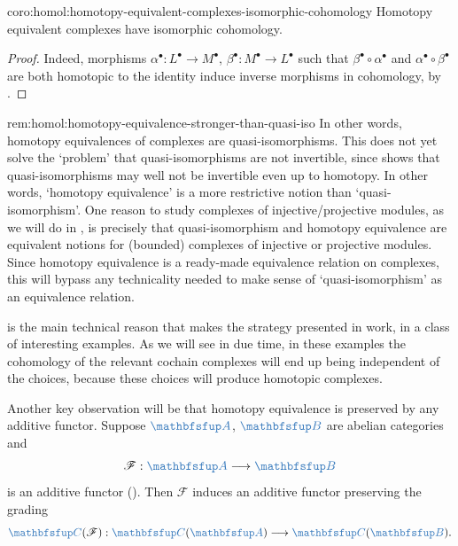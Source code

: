 \begin{coro}{}{coro:homol:homotopy-equivalent-complexes-isomorphic-cohomology}
  Homotopy equivalent complexes have isomorphic cohomology.
\end{coro}

\begin{proof}
  Indeed, morphisms $\alpha^\bullet : L^\bullet \to M^\bullet$,
  $\beta^\bullet : M^\bullet \to L^\bullet$ such that
  $\beta^\bullet \circ \alpha^\bullet$ and
  $\alpha^\bullet \circ \beta^\bullet$ are both homotopic to the
  identity induce inverse morphisms in cohomology, by
  .
\end{proof}

\begin{rem}{}{rem:homol:homotopy-equivalence-stronger-than-quasi-iso}
  In other words, homotopy equivalences of complexes are
  quasi-isomorphisms. This does not yet solve the `problem' that
  quasi-isomorphisms are not invertible, since  shows
  that quasi-isomorphisms may well not be invertible even up to
  homotopy.  In other words, `homotopy equivalence' is a more
  restrictive notion than `quasi-isomorphism'. One reason to study
  complexes of injective/projective modules, as we will do in
  ,
  is precisely that quasi-isomorphism and homotopy equivalence are
  equivalent notions for (bounded) complexes of injective or
  projective modules. Since homotopy equivalence is a ready-made
  equivalence relation on complexes, this will bypass any technicality
  needed to make sense of `quasi-isomorphism' as an equivalence
  relation.
\end{rem}

 is the main technical reason that makes the strategy
presented in
work, in a class of interesting examples. As we will see in due time,
in these examples the cohomology of the relevant cochain complexes
will end up being independent of the choices, because these choices
will produce homotopic complexes.

Another key observation will be that homotopy equivalence is preserved
by any additive functor. Suppose $\categ{A}$, $\categ{B}$ are abelian
categories and
\[
  \mathscr{F} : \categ{A} \longrightarrow \categ{B}
\]
is an additive functor (). Then $\mathscr{F}$ induces
an additive functor preserving the grading
\[
  \categ{C}(\mathscr{F}) : \categ{C}(\categ{A}) \longrightarrow
  \categ{C}(\categ{B}).
\]

